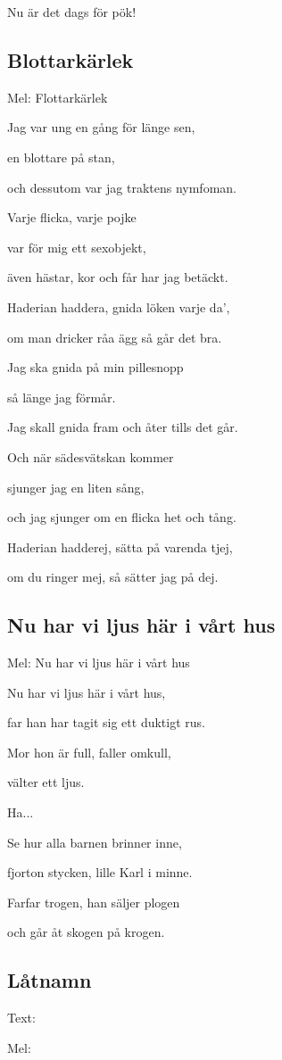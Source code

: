 Nu är det dags för pök! 

\subsection{\textbf{Blottarkärlek}}

Mel: Flottarkärlek\bigskip


Jag var ung en gång för länge sen,

en blottare på stan,

och dessutom var jag traktens nymfoman.

Varje flicka, varje pojke

var för mig ett sexobjekt,

även hästar, kor och får har jag betäckt.

Haderian haddera, gnida löken varje da',

om man dricker råa ägg så går det bra.\bigskip


Jag ska gnida på min pillesnopp

så länge jag förmår.

Jag skall gnida fram och åter tills det går.

Och när sädesvätskan kommer

sjunger jag en liten sång,

och jag sjunger om en flicka het och tång.

Haderian hadderej, sätta på varenda tjej,

om du ringer mej, så sätter jag på dej.

\subsection{\textbf{Nu har vi ljus här i vårt hus}}

Mel: Nu har vi ljus här i vårt hus \bigskip

Nu har vi ljus här i vårt hus,

far han har tagit sig ett duktigt rus.

Mor hon är full, faller omkull,

välter ett ljus.

Ha...

Se hur alla barnen brinner inne,

fjorton stycken, lille Karl i minne.

Farfar trogen, han säljer plogen

och går åt skogen på krogen.

\subsection{\textbf{Låtnamn}}

Text: 

Mel: \bigskip

\newpage